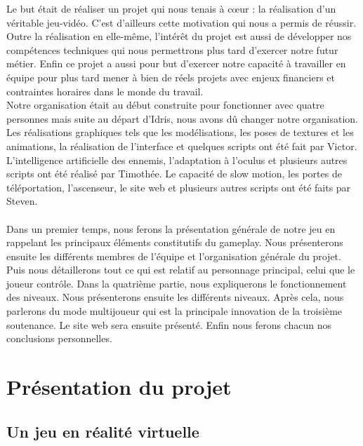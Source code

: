 \documentclass[12pt]{article}
\begin{document}
Le but était de réaliser un projet qui nous tenais à cœur : la réalisation d'un véritable jeu-vidéo. C'est d'ailleurs cette motivation qui nous a permis de réussir. Outre la réalisation en elle-même, l'intérêt du projet est aussi de développer nos compétences techniques qui nous permettrons plus tard d'exercer notre futur métier. Enfin ce projet a aussi pour but d'exercer notre capacité à travailler en équipe pour plus tard mener à bien de réels projets avec enjeux financiers et contraintes horaires dans le monde du travail.\\
Notre organisation était au début construite pour fonctionner avec quatre personnes mais suite au départ d'Idris, nous avons dû changer notre organisation. Les réalisations graphiques tels que les modélisations, les poses de textures et les animations, la réalisation de l'interface et quelques scripts ont été fait par Victor. L'intelligence artificielle des ennemis, l'adaptation à l'oculus et plusieurs autres scripts ont été réalisé par Timothée. Le capacité de slow motion, les portes de téléportation, l'ascenseur, le site web et plusieurs autres scripts ont été faits par Steven.\\\\

Dans un premier temps, nous ferons la présentation générale de notre jeu en rappelant les principaux éléments constitutifs du gameplay. Nous présenterons ensuite les différents membres de l'équipe et l'organisation générale du projet. Puis nous détaillerons tout ce qui est relatif au personnage principal, celui que le joueur contrôle. Dans la quatrième partie, nous expliquerons le fonctionnement des niveaux. Nous présenterons ensuite les différents niveaux. Après cela, nous parlerons du mode multijoueur qui est la principale innovation de la troisième soutenance. Le site web sera ensuite présenté. Enfin nous ferons chacun nos conclusions personnelles.


\newpage

\renewcommand{\contentsname}{Sommaire}
\tableofcontents

\newpage

\section{Présentation du projet}

\subsection{Un jeu en réalité virtuelle}
\end{document}
